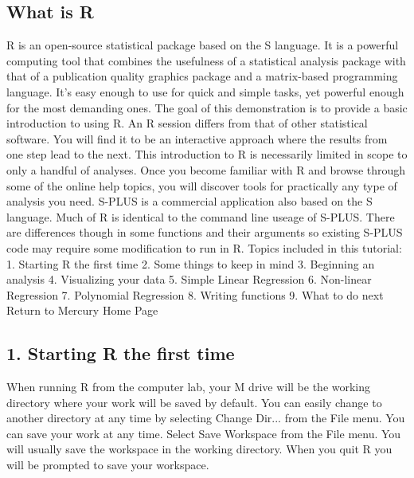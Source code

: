 { 
\subsection*{What is R}

R is an open-source statistical package based on the S language. It is a powerful computing tool that combines the usefulness of a statistical analysis package with that of a publication quality graphics package and a matrix-based programming language. It's easy enough to use for quick and simple tasks, yet powerful enough for the most demanding ones. The goal of this demonstration is to provide a basic introduction to using R. An R session differs from that of other statistical software. You will find it to be an interactive approach where the results from one step lead to the next. This introduction to R is necessarily limited in scope to only a handful of analyses. Once you become familiar with R and browse through some of the online help topics, you will discover tools for practically any type of analysis you need. S-PLUS is a commercial application also based on the S language. Much of R is identical to the command line useage of S-PLUS. There are differences though in some functions and their arguments so existing S-PLUS code may require some modification to run in R. 
Topics included in this tutorial: 
1. Starting R the first time
2. Some things to keep in mind
3. Beginning an analysis
4. Visualizing your data
5. Simple Linear Regression
6. Non-linear Regression
7. Polynomial Regression
8. Writing functions
9. What to do next 
Return to Mercury Home Page 
\subsection*{1. Starting R the first time}


When running R from the computer lab, your M drive will be the working directory where your work will be saved by default. You can easily change to another directory at any time by selecting Change Dir... from the File menu. 
You can save your work at any time. Select Save Workspace from the File menu. You will usually save the workspace in the working directory. When you quit R you will be prompted to save your workspace. 
}
